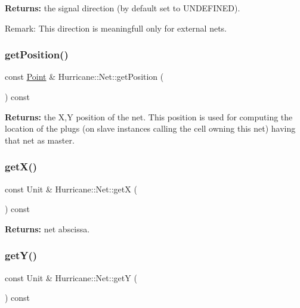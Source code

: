 {\bfseries Returns\+:} the signal direction (by default set to U\+N\+D\+E\+F\+I\+N\+ED).

\begin{DoxyParagraph}{Remark\+:}
This direction is meaningfull only for external nets. 
\end{DoxyParagraph}
\mbox{\label{classHurricane_1_1Net_abcfdec9c953d228845fdb9d75e8173cc}} 
\subsubsection{\texorpdfstring{get\+Position()}{getPosition()}}
{\footnotesize\ttfamily const \hyperlink{classHurricane_1_1Point}{Point} \& Hurricane\+::\+Net\+::get\+Position (\begin{DoxyParamCaption}{ }\end{DoxyParamCaption}) const\hspace{0.3cm}{\ttfamily [inline]}}

{\bfseries Returns\+:} the X,Y position of the net. This position is used for computing the location of the plugs (on slave instances calling the cell owning this net) having that net as master. \mbox{\label{classHurricane_1_1Net_a1f8f4c4632614b84a1227a1da8310428}} 
\subsubsection{\texorpdfstring{get\+X()}{getX()}}
{\footnotesize\ttfamily const Unit \& Hurricane\+::\+Net\+::getX (\begin{DoxyParamCaption}{ }\end{DoxyParamCaption}) const\hspace{0.3cm}{\ttfamily [inline]}}

{\bfseries Returns\+:} net abscissa. \mbox{\label{classHurricane_1_1Net_aa97899b408aa47ec22792b5c6d6e9216}} 
\subsubsection{\texorpdfstring{get\+Y()}{getY()}}
{\footnotesize\ttfamily const Unit \& Hurricane\+::\+Net\+::getY (\begin{DoxyParamCaption}{ }\end{DoxyParamCaption}) const\hspace{0.3cm}{\ttfamily [inline]}}

